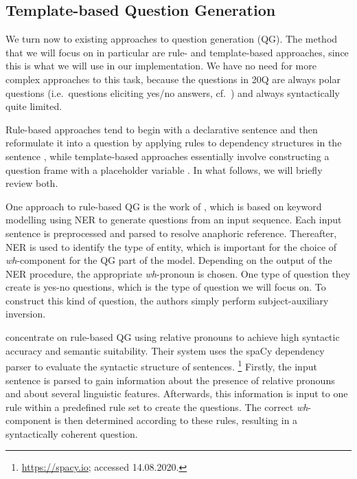 \documentclass[11pt,a4paper]{article}
\begin{document}
\subsection{Template-based Question Generation}
\label{subsec:qglit}

We turn now to existing approaches to question generation (QG).
The method that we will focus on in particular are rule- and template-based approaches, since this is what we will use in our implementation.
We have no need for more complex approaches to this task, because the questions in 20Q are always polar questions (i.e.\ questions eliciting yes/no answers, cf.\ \citealt{Huddleston1994}) and always syntactically quite limited.

Rule-based approaches tend to begin with a declarative sentence and then reformulate it into a question by applying rules to dependency structures in the sentence \citep[e.g.][]{KhullarEa2018, MhatreEa2019}, while template-based approaches essentially involve constructing a question frame with a placeholder variable \citep[e.g.][]{Zerr2014, Mandasari2019, FabbriEa2020}. 
In what follows, we will briefly review both.

One approach to rule-based QG is the work of \citet{MhatreEa2019}, which is based on keyword modelling using NER to generate questions from an input sequence. 
Each input sentence is preprocessed and parsed to resolve anaphoric reference. 
Thereafter, NER is used to identify the type of entity, which is important for the choice of \textit{wh}-component for the QG part of the model. 
Depending on the output of the NER procedure, the appropriate \textit{wh}-pronoun is chosen. 
One type of question they create is yes-no questions, which is the type of question we will focus on.
To construct this kind of question, the authors simply perform subject-auxiliary inversion. 

\citet{KhullarEa2018} concentrate on rule-based QG using relative pronouns to achieve high syntactic accuracy and semantic suitability. 
Their system uses the spaCy dependency parser to evaluate the syntactic structure of sentences.%
	\footnote{\url{https://spacy.io}; accessed 14.08.2020.}
Firstly, the input sentence is parsed to gain information about the presence of relative pronouns and about several linguistic features. 
Afterwards, this information is input to one rule within a predefined rule set to create the questions. 
The correct \textit{wh}-component is then determined according to these rules, resulting in a syntactically coherent question. 
\end{document}
